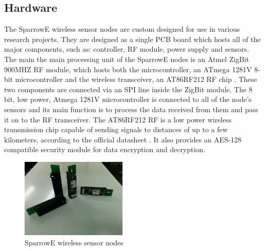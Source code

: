 \subsection{Hardware}

The SparrowE wireless sensor nodes are custom designed for use in various research projects.
They are designed as a single PCB board which hosts all of the major components, such as: controller,
RF module, power supply and sensors. The main the main processing unit of the SparrowE nodes is an Atmel 
ZigBit 900MHZ RF module\cite{AtmelZigBit900}, which hosts both the microcontroller, an ATmega 1281V 8-bit microcontroller \cite{ATmega1281} and the 
wireless transceiver, an AT86RF212 RF chip \cite{AT86RF212}. These two components are connected via an SPI line inside the ZigBit 
module. The 8 bit, low power, Atmega 1281V microcontroller is connected to all of the node's sensors and its 
main function is to process the data received from them and pass it on to the RF transceiver. The AT86RF212 RF 
is a low power wireless transmission chip capable of sending signals to distances of up to a few kilometers, according 
to the official datasheet \cite{datasheetatmel}. It also provides an AES-128 compatible security module for data 
encryption and decryption.

\begin{figure}[ht] \centering
  \includegraphics[width=0.45\textwidth]{img/sparrow-nodes.jpg}
  \caption{SparrowE wireless sensor nodes}
\end{figure}

